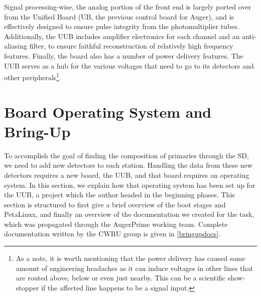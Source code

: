 
Signal processing-wise, the analog portion of the front end is largely ported over from the Unified Board (UB, the previous control board for Auger), and is effectively designed to ensure pulse integrity from the photomultiplier tubes. Additionally, the UUB includes amplifier electronics for each channel and an anti-aliasing filter, to ensure faithful reconstruction of relatively high frequency features. Finally, the board also has a number of power delivery features. The UUB serves as a hub for the various voltages that need to go to its detectors and other peripherals\footnote{As a note, it is worth mentioning that the power delivery has caused some amount of engineering headaches as it can induce voltages in other lines that are routed above, below or even just nearby. This can be a scientific show-stopper if the affected line happens to be a signal input.}.

\section{Board Operating System and Bring-Up}
\label{bringup}
To accomplish the goal of finding the composition of primaries through the SD, we need to add new detectors to each station. Handling the data from these new detectors requires a new board, the UUB, and that board requires an operating system. In this section, we explain how that operating system has been set up for the UUB, a project which the author headed in the beginning phases. This section is structured to first give a brief overview of the boot stages and PetaLinux, and finally an overview of the documentation we created for the task, which was propagated through the AugerPrime working team. Complete documentation written by the CWRU group is given in \autoref{bringupdocs}.
